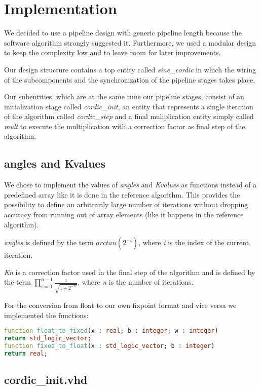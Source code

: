 \section{Implementation}
We decided to use a pipeline design with generic pipeline length because the software algorithm strongly suggested it. Furthermore, we used a modular design to keep the complexity low and to leave room for later improvements.

Our design structure contains a top entity called \textit{sine\_cordic} in which the wiring of the subcomponents and the synchronization of the pipeline stages takes place.

Our subentities, which are at the same time our pipeline stages, consist of an initialization stage called \textit{cordic\_init}, an entity that represents a single iteration of the algorithm called \textit{cordic\_step} and a final muliplication entity simply called \textit{mult} to execute the multiplication with a correction factor as final step of the algorithm. 

\subsection{angles and Kvalues}

We chose to implement the values of \textit{angles} and \textit{Kvalues}  as functions
instead of a predefined array like it is done in the reference algorithm. This provides the possibility to define an arbitrarily large number of iterations without dropping accuracy from running out of array elements (like it happens in the reference algorithm).

\textit{angles} is defined by the term \(arctan(2^{-i})\), where \textit{i} is the index of the current iteration. 

\textit{Kn} is a correction factor used in the final step of the algorithm and is defined by the term $\prod\limits_{i=0}^{n-1}\frac{1}{\sqrt{1+2^{-2i}}}$, where \textit{n} is the number of iterations.

For the conversion from float to our own fixpoint format and vice versa we implemented the functions:

\begin{lstlisting}[language=VHDL]
function float_to_fixed(x : real; b : integer; w : integer) 
return std_logic_vector;
function fixed_to_float(x : std_logic_vector; b : integer) 
return real;
\end{lstlisting}

\subsection{cordic\_init.vhd}

